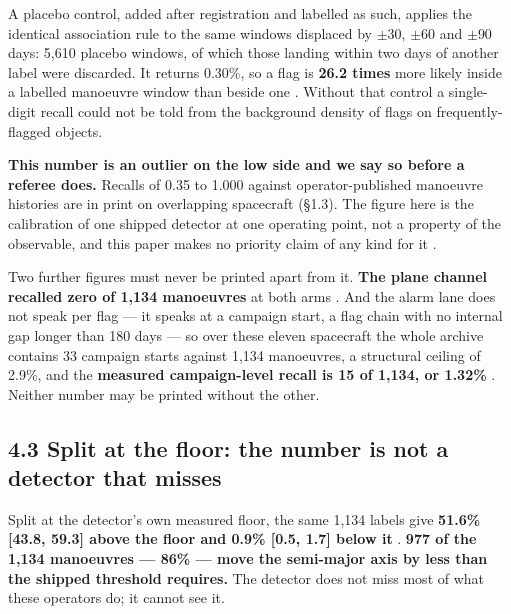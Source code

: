 \documentclass[11pt]{article}
\begin{document}
A placebo control, added after registration and labelled as such, applies the identical association rule to the same windows displaced by $\pm$30, $\pm$60 and $\pm$90 days: 5,610 placebo windows, of which those landing within two days of another label were discarded. It returns 0.30\%, so a flag is \textbf{26.2 times} more likely inside a labelled manoeuvre window than beside one%
. Without that control a single-digit recall could not be told from the background density of flags on frequently-flagged objects.

\textbf{This number is an outlier on the low side and we say so before a referee does.} Recalls of 0.35 to 1.000 against operator-published manoeuvre histories are in print on overlapping spacecraft (\S{}1.3). The figure here is the calibration of one shipped detector at one operating point, not a property of the observable, and this paper makes no priority claim of any kind for it%
.

Two further figures must never be printed apart from it. \textbf{The plane channel recalled zero of 1,134 manoeuvres} at both arms%
. And the alarm lane does not speak per flag --- it speaks at a campaign start, a flag chain with no internal gap longer than 180 days --- so over these eleven spacecraft the whole archive contains 33 campaign starts against 1,134 manoeuvres, a structural ceiling of 2.9\%, and the \textbf{measured campaign-level recall is 15 of 1,134, or 1.32\%}%
. Neither number may be printed without the other.

\subsection*{4.3 Split at the floor: the number is not a detector that misses}

Split at the detector's own measured floor, the same 1,134 labels give \textbf{51.6\% [43.8, 59.3] above the floor and 0.9\% [0.5, 1.7] below it}%
. \textbf{977 of the 1,134 manoeuvres --- 86\% --- move the semi-major axis by less than the shipped threshold requires.} The detector does not miss most of what these operators do; it cannot see it.
\end{document}
